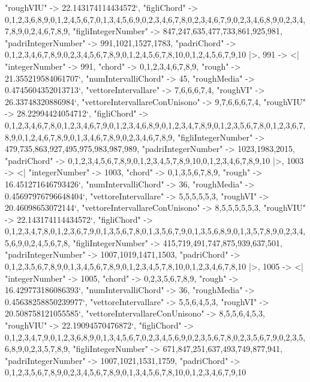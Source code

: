 \documentclass[
]{article}
\begin{document}
\begin{DatasetVerbatim}
    "roughVIU" -> 22.143174114434572`,
    "figliChord" -> {{0,1,2,3,6,8,9},{0,1,2,4,5,6,7},{0,1,3,4,5,6,9},{0,2,3,4,6,7,8},{0,2,3,4,6,7,9},{0,2,3,4,6,8,9},{0,2,3,4,7,8,9},{0,2,4,6,7,8,9}},
    "figliIntegerNumber" -> {847,247,635,477,733,861,925,981},
    "padriIntegerNumber" -> {991,1021,1527,1783},
    "padriChord" -> {{0,1,2,3,4,6,7,8,9},{0,2,3,4,5,6,7,8,9},{0,1,2,4,5,6,7,8,10},{0,1,2,4,5,6,7,9,10}}
  |>,
  991 -> <|
    "integerNumber" -> 991,
    "chord" -> {0,1,2,3,4,6,7,8,9},
    "rough" -> 21.355219584061707`,
    "numIntervalliChord" -> 45,
    "roughMedia" -> 0.4745604352013713`,
    "vettoreIntervallare" -> {7,6,6,6,7,4},
    "roughVI" -> 26.33748320886984`,
    "vettoreIntervallareConUnisono" -> {9,7,6,6,6,7,4},
    "roughVIU" -> 28.22994424054712`,
    "figliChord" -> {{0,1,2,3,4,6,7,8},{0,1,2,3,4,6,7,9},{0,1,2,3,4,6,8,9},{0,1,2,3,4,7,8,9},{0,1,2,3,5,6,7,8},{0,1,2,3,6,7,8,9},{0,1,2,4,6,7,8,9},{0,1,3,4,6,7,8,9},{0,2,3,4,6,7,8,9}},
    "figliIntegerNumber" -> {479,735,863,927,495,975,983,987,989},
    "padriIntegerNumber" -> {1023,1983,2015},
    "padriChord" -> {{0,1,2,3,4,5,6,7,8,9},{0,1,2,3,4,5,7,8,9,10},{0,1,2,3,4,6,7,8,9,10}}
  |>,
  1003 -> <|
    "integerNumber" -> 1003,
    "chord" -> {0,1,3,5,6,7,8,9},
    "rough" -> 16.451271646793426`,
    "numIntervalliChord" -> 36,
    "roughMedia" -> 0.45697976796648404`,
    "vettoreIntervallare" -> {5,5,5,5,5,3},
    "roughVI" -> 20.46098653072144`,
    "vettoreIntervallareConUnisono" -> {8,5,5,5,5,5,3},
    "roughVIU" -> 22.143174114434572`,
    "figliChord" -> {{0,1,2,3,4,7,8},{0,1,2,3,6,7,9},{0,1,3,5,6,7,8},{0,1,3,5,6,7,9},{0,1,3,5,6,8,9},{0,1,3,5,7,8,9},{0,2,3,4,5,6,9},{0,2,4,5,6,7,8}},
    "figliIntegerNumber" -> {415,719,491,747,875,939,637,501},
    "padriIntegerNumber" -> {1007,1019,1471,1503},
    "padriChord" -> {{0,1,2,3,5,6,7,8,9},{0,1,3,4,5,6,7,8,9},{0,1,2,3,4,5,7,8,10},{0,1,2,3,4,6,7,8,10}}
  |>,
  1005 -> <|
    "integerNumber" -> 1005,
    "chord" -> {0,2,3,5,6,7,8,9},
    "rough" -> 16.429773186086393`,
    "numIntervalliChord" -> 36,
    "roughMedia" -> 0.45638258850239977`,
    "vettoreIntervallare" -> {5,5,6,4,5,3},
    "roughVI" -> 20.508758121055585`,
    "vettoreIntervallareConUnisono" -> {8,5,5,6,4,5,3},
    "roughVIU" -> 22.19094570476872`,
    "figliChord" -> {{0,1,2,3,4,7,9},{0,1,2,3,6,8,9},{0,1,3,4,5,6,7},{0,2,3,4,5,6,9},{0,2,3,5,6,7,8},{0,2,3,5,6,7,9},{0,2,3,5,6,8,9},{0,2,3,5,7,8,9}},
    "figliIntegerNumber" -> {671,847,251,637,493,749,877,941},
    "padriIntegerNumber" -> {1007,1021,1531,1759},
    "padriChord" -> {{0,1,2,3,5,6,7,8,9},{0,2,3,4,5,6,7,8,9},{0,1,3,4,5,6,7,8,10},{0,1,2,3,4,6,7,9,10}}

\end{DatasetVerbatim}
\end{document}
